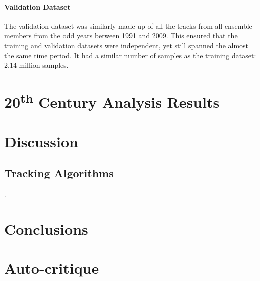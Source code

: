 \documentclass[pdftex,12pt,a4paper]{report}
\newcommand{\ts}{\textsuperscript}
\begin{document}
\subsubsection{Validation Dataset} The validation dataset was similarly made up of all the tracks
from all ensemble members from the odd years between 1991 and 2009. This ensured that the training
and validation datasets were independent, yet still spanned the almost the same time period. It had
a similar number of samples as the training dataset: 2.14 million samples.

\chapter{20\ts{th} Century Analysis Results}
\label{chap:results_analysis}

\chapter{Discussion}
\label{chap:discussion}

\section{Tracking Algorithms}
\label{sec:discussion_tracking_algs}.

\chapter{Conclusions}
\label{chap:conclusion}

\chapter*{Auto-critique}

\printbibliography[title={References}]

\end{document}
